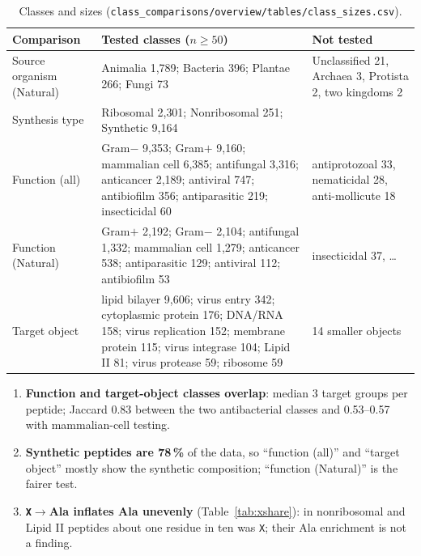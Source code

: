 \documentclass[11pt,a4paper]{article}
\begin{document}
\begin{table}[H]\centering\small
\begin{tabularx}{\textwidth}{>{\raggedright}p{3.0cm}>{\raggedright}p{8.4cm}X}
\toprule
Comparison & Tested classes ($n\geq50$) & Not tested\tabularnewline\midrule
Source organism (Natural) & Animalia 1{,}789; Bacteria 396; Plantae 266; Fungi 73 & Unclassified 21, Archaea 3, Protista 2, two kingdoms 2\tabularnewline
Synthesis type & Ribosomal 2{,}301; Nonribosomal 251; Synthetic 9{,}164 & \tabularnewline
Function (all) & Gram$-$ 9{,}353; Gram$+$ 9{,}160; mammalian cell 6{,}385; antifungal 3{,}316; anticancer 2{,}189; antiviral 747; antibiofilm 356; antiparasitic 219; insecticidal 60 & antiprotozoal 33, nematicidal 28, anti-mollicute 18\tabularnewline
Function (Natural) & Gram$+$ 2{,}192; Gram$-$ 2{,}104; antifungal 1{,}332; mammalian cell 1{,}279; anticancer 538; antiparasitic 129; antiviral 112; antibiofilm 53 & insecticidal 37, \dots\tabularnewline
Target object & lipid bilayer 9{,}606; virus entry 342; cytoplasmic protein 176; DNA/RNA 158; virus replication 152; membrane protein 115; virus integrase 104; Lipid II 81; virus protease 59; ribosome 59 & 14 smaller objects\tabularnewline\bottomrule
\end{tabularx}
\caption{Classes and sizes (\texttt{class\_comparisons/overview/tables/class\_sizes.csv}).}
\end{table}

\begin{caution}
\begin{enumerate}
\item \textbf{Function and target-object classes overlap}: median 3 target groups per peptide; Jaccard 0.83 between the two antibacterial classes and 0.53--0.57 with mammalian-cell testing.
\item \textbf{Synthetic peptides are 78\,\%} of the data, so ``function (all)'' and ``target object'' mostly show the synthetic composition; ``function (Natural)'' is the fairer test.
\item \textbf{\texttt{X}$\rightarrow$Ala inflates Ala unevenly} (Table~\ref{tab:xshare}): in nonribosomal and Lipid II peptides about one residue in ten was \texttt{X}; their Ala enrichment is not a finding.
\end{enumerate}
\end{caution}
\end{document}
